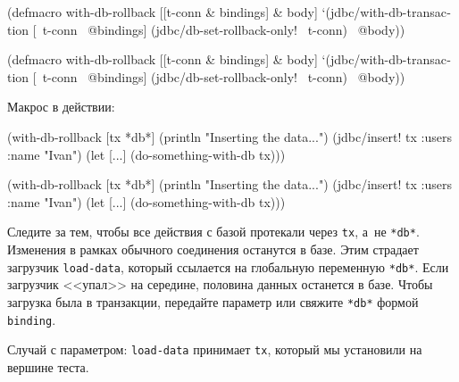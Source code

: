 \ifx\DEVICETYPE\MOBILE

\begin{english}
  \begin{clojure}
(defmacro with-db-rollback
  [[t-conn & bindings] & body]
  `(jdbc/with-db-transaction
     [~t-conn ~@bindings]
     (jdbc/db-set-rollback-only!
       ~t-conn)
     ~@body))
  \end{clojure}
\end{english}

\else

\begin{english}
  \begin{clojure}
(defmacro with-db-rollback
  [[t-conn & bindings] & body]
  `(jdbc/with-db-transaction [~t-conn ~@bindings]
     (jdbc/db-set-rollback-only! ~t-conn)
     ~@body))
  \end{clojure}
\end{english}

\fi

\noindent
Макрос в действии:

\ifx\DEVICETYPE\MOBILE

\begin{english}
  \begin{clojure}
(with-db-rollback [tx *db*]
  (println "Inserting the data...")
  (jdbc/insert! tx
    :users {:name "Ivan"})
  (let [...]
    (do-something-with-db tx)))
  \end{clojure}
\end{english}

\else

\begin{english}
  \begin{clojure}
(with-db-rollback [tx *db*]
  (println "Inserting the data...")
  (jdbc/insert! tx :users {:name "Ivan"})
  (let [...]
    (do-something-with-db tx)))
  \end{clojure}
\end{english}

\fi

Следите за тем, чтобы все действия с базой протекали через \verb|tx|, а~не
\verb|*db*|. Изменения в рамках обычного соединения останутся в базе. Этим
страдает загрузчик \verb|load-data|, который ссылается на глобальную переменную
\verb|*db*|. Если загрузчик <<упал>> на середине, половина данных останется в
базе. Чтобы загрузка была в транзакции, передайте параметр или свяжите
\verb|*db*| формой \verb|binding|.

Случай с параметром: \verb|load-data| принимает \verb|tx|, который мы
установили на вершине теста.

